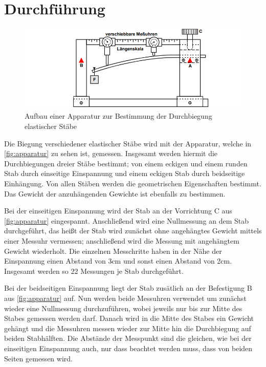 \section{Durchführung}
\label{sec:Durchführung}
    \begin{figure}
      \centering
      \includegraphics{content/apparatur.png}
      \caption{Aufbau einer Apparatur zur Bestimmung der Durchbiegung elastischer Stäbe \cite[111]{V103}}
      \label{fig:apparatur}
    \end{figure}
    Die Biegung verschiedener elastischer Stäbe wird mit der Apparatur, welche in \autoref{fig:apparatur} zu sehen ist, gemessen.
    Insgesamt werden hiermit die Durchbiegungen dreier Stäbe bestimmt; von einem eckigen und einem runden Stab durch einseitige Einspannung
    und einem eckigen Stab durch beidseitige Einhängung. Von allen Stäben werden die geometrischen Eigenschaften bestimmt.
    Das Gewicht der anzuhängenden Gewichte ist ebenfalls zu bestimmen.


    Bei der einseitigen Einspannung wird der Stab an der Vorrichtung C aus \autoref{fig:apparatur} eingespannt. Anschließend wird eine Nullmessung 
    an dem Stab durchgeführt, das heißt der Stab wird zunächst ohne angehängtes Gewicht mittels einer Messuhr vermessen; anschließend
    wird die Messung mit angehängtem Gewicht wiederholt. Die einzelnen Messchritte haben in der Nähe der Einspannung einen Abstand von
    3cm und sonst einen Abstand von 2cm. Insgesamt werden so 22 Messungen je Stab durchgeführt.


    Bei der beidseitigen Einspannung liegt der Stab zusätlich an der Befestigung B aus \autoref{fig:apparatur} auf. Nun werden beide Messuhren verwendet
    um zunächst wieder eine Nullmessung durchzuführen, wobei jeweils nur bis zur Mitte des Stabes gemessen werden darf. 
    Danach wird in die Mitte des Stabes ein Gewicht gehängt und die Messuhren messen wieder zur Mitte hin die Durchbiegung auf
    beiden Stabhälften. Die Abstände der Messpunkt sind die gleichen, wie bei der einseitigen Einspannung auch, nur dass beachtet
    werden muss, dass von beiden Seiten gemessen wird.